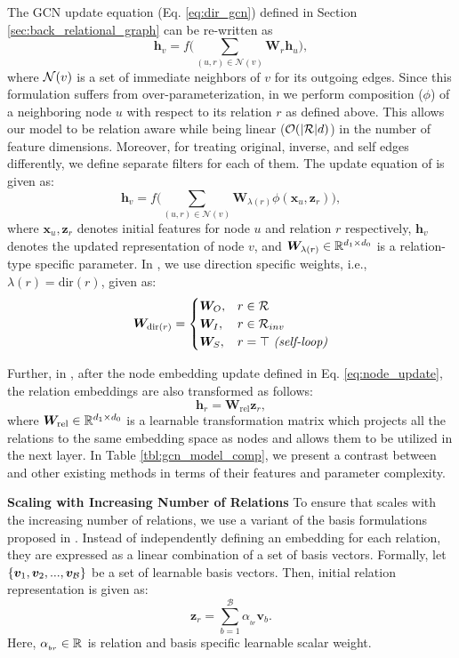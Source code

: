 \documentclass{article} \usepackage{iclr2020_conference,times}
\begin{document}
The GCN update equation (Eq. \ref{eq:dir_gcn}) defined in Section \ref{sec:back_relational_graph} can be re-written as
\[
\bm{h}_{v} = f \Bigg(\sum_{ (u,r) \in \mathcal{N}(v)}  \bm{W}_{r} \bm{h}_{u} \Bigg),
\]
where $\mathcal{N}(v)$ is a set of immediate neighbors of $v$ for its outgoing edges. Since this formulation suffers from over-parameterization, in \method{} we perform composition ($\phi$) of a neighboring node $u$ with respect to its relation $r$ as defined above. This allows our model to be relation aware while being linear ($\mathcal{O}(|\mathcal{R}|d)$) in the number of feature dimensions. Moreover, for treating original, inverse, and self edges differently, we define separate filters for each of them. The update equation of \method{} is given as:
\begin{equation}
\label{eq:node_update}
\bm{h}_{v} = f \Bigg(\sum_{ (u,r) \in \mathcal{N}(v)} \bm{W}_{\lambda(r)} \phi(\bm{x}_{u}, \bm{z}_r) \Bigg),
\end{equation}
where $\bm{x}_u, \bm{z}_r$ denotes initial features for node $u$ and relation $r$ respectively, $\bm{h}_{v}$ denotes the updated representation of node $v$, and $\bm{W}_{\lambda(r)} \in \mathbb{R}^{d_1 \times d_0}$ is a relation-type specific parameter.  In \method{}, we use direction specific weights, i.e., $\lambda({r}) = \mathrm{dir}(r)$, given as:
\begin{equation}
\label{eqn:weight_def}
\bm{W}_{\mathrm{dir}(r)} =
\begin{cases} 
\bm{W}_O, & r \in \mathcal{R}\\
\bm{W}_I, & r \in \mathcal{R}_{inv}\\
\bm{W}_S, & r = \top  \ \text{\textit{(self-loop)}}
\end{cases}
\end{equation}

Further, in \method{}, after the node embedding update defined in Eq. \ref{eq:node_update}, the relation embeddings are also transformed as follows:
\begin{equation}
\label{eq:rel_share}
\bm{h}_r = \bm{W}_{\mathrm{rel}} \bm{z}_r   ,
\end{equation}
where $\bm{W}_{\mathrm{rel}} \in \mathbb{R}^{d_1 \times d_0}$ is a learnable transformation matrix which projects all the relations to the same embedding space as nodes and allows them to be utilized in the next \method{} layer. In Table \ref{tbl:gcn_model_comp}, we present a contrast between \method{} and other existing methods in terms of their features and parameter complexity. 

\textbf{Scaling with Increasing Number of Relations} To ensure that \method{} scales with the increasing number of relations, we use a variant of the basis formulations proposed in \citet{r_gcn}. Instead of independently defining an embedding for each relation, they are expressed as a linear combination of a set of basis vectors. Formally, let $ \{\bm{v}_1, \bm{v}_2, ..., \bm{v}_{\mathcal{B}} \}$ be a set of learnable basis vectors. Then, initial relation representation is given as:
\[
\bm{z}_r = \sum_{b=1}^{\mathcal{B}} \alpha_{{}_{br}} \bm{v}_b.
\]
Here, $\alpha_{{}_{br}} \in \mathbb{R}^{}$ is relation and basis specific learnable scalar weight.  
\end{document}
